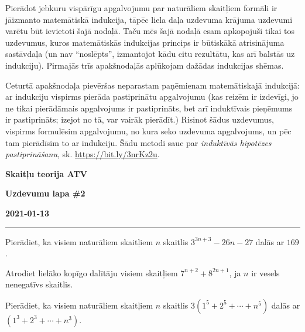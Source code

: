 \documentclass[a4paper,12pt]{article}
\begin{document}
Pierādot jebkuru vispārīgu apgalvojumu par naturāliem skaitļiem formāli ir jāizmanto ma\-te\-mā\-tis\-kā indukcija, 
tāpēc liela daļa uzdevuma krājuma uzdevumi varētu būt ievietoti šajā nodaļā. 
Taču mēs šajā nodaļā esam apkopojuši tikai tos uzdevumus, 
kuros matemātiskās indukcijas princips ir būtiskākā atrisinājuma sastāvdaļa (un nav ``noslēpts'', izmantojot
kādu citu rezultātu, kas arī balstās uz indukciju). 
Pirmajās trīs apakšnodaļās aplūkojam dažādas indukcijas shēmas. 

Ceturtā apakšnodaļa pievēršas neparastam paņēmienam matemātiskajā indukcijā: 
ar indukciju vispirms pierāda pastiprinātu apgalvojumu (kas reizēm ir izdevīgi, jo 
ne tikai pierādāmais apgalvojums ir pastiprināts, bet arī induktīvais pieņēmums ir pastiprināts; 
izejot no tā, var vairāk pierādīt.)
Risinot šādus uzdevumus, vispirms formulēsim apgalvojumu, 
no kura seko uzdevuma apgalvojums, un pēc tam pierādīsim to ar indukciju.
Šādu metodi sauc par {\em induktīvās hipotēzes pastiprināšanu}, 
sk. \url{https://bit.ly/3nrKz2u}.



\clearpage
\begin{center}
\parbox{3.5cm}{\flushleft\bf Skaitļu teorija \newline ATV} \hfill {\bf\LARGE Uzdevumu lapa \#2} \hfill \parbox{3.5cm}{\flushright\bf 2021-01-13} %
\end{center}

\hrule


\vspace{10pt}
\begin{problem}
Pierādiet, ka visiem naturāliem skaitļiem $n$ skaitlis $3^{3n+3} - 26n - 27$ dalās ar $169$.
\end{problem}


\vspace{10pt}
\begin{problem}
Atrodiet lielāko kopīgo dalītāju visiem skaitļiem $7^{n+2} + 8^{2n+1}$, 
ja $n$ ir vesels nenegatīvs skaitlis.
\end{problem}


\vspace{10pt}
\begin{problem}
Pierādiet, ka visiem naturāliem skaitļiem $n$ skaitlis 
${\displaystyle 3\left( 1^5 + 2^5 + \cdots + n^5 \right)}$ dalās ar
${\displaystyle \left( 1^3 + 2^3 + \cdots + n^3 \right)}$.
\end{problem}
\end{document}
